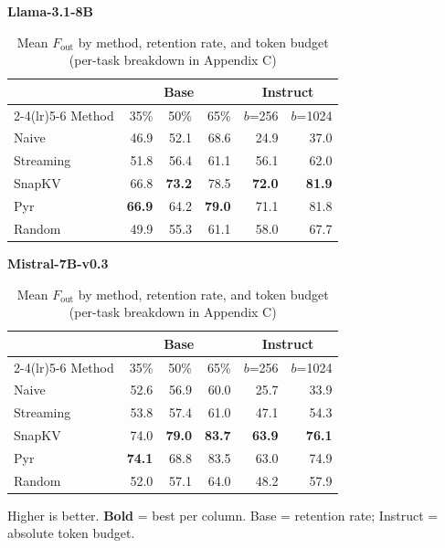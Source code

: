 \documentclass[10pt,letterpaper]{article}
\begin{document}
\begin{table}[H]
\centering
\small
\captionsetup{justification=centering}
\caption{Mean \(F_{\text{out}}\) by method, retention rate, and token budget (per-task breakdown in Appendix C)}
\label{tab:t4}
\begin{minipage}[t]{0.49\textwidth}
\centering
\textbf{Llama-3.1-8B}\\[0.4em]
\begin{tabular}{@{}lrrrrr@{}}
\toprule
& \multicolumn{3}{c}{Base} & \multicolumn{2}{c}{Instruct}\\
\cmidrule(lr){2-4}\cmidrule(lr){5-6}
Method & 35\% & 50\% & 65\% & $b$=256 & $b$=1024\\
\midrule
Naive      & 46.9 & 52.1 & 68.6 & 24.9 & 37.0\\
Streaming  & 51.8 & 56.4 & 61.1 & 56.1 & 62.0\\
SnapKV     & 66.8 & \textbf{73.2} & 78.5 & \textbf{72.0} & \textbf{81.9}\\
Pyr        & \textbf{66.9} & 64.2 & \textbf{79.0} & 71.1 & 81.8\\
Random     & 49.9 & 55.3 & 61.1 & 58.0 & 67.7\\
\bottomrule
\end{tabular}
\end{minipage}%
\hfill
\begin{minipage}[t]{0.49\textwidth}
\centering
\textbf{Mistral-7B-v0.3}\\[0.4em]
\begin{tabular}{@{}lrrrrr@{}}
\toprule
& \multicolumn{3}{c}{Base} & \multicolumn{2}{c}{Instruct}\\
\cmidrule(lr){2-4}\cmidrule(lr){5-6}
Method & 35\% & 50\% & 65\% & $b$=256 & $b$=1024\\
\midrule
Naive      & 52.6 & 56.9 & 60.0 & 25.7 & 33.9\\
Streaming  & 53.8 & 57.4 & 61.0 & 47.1 & 54.3\\
SnapKV     & 74.0 & \textbf{79.0} & \textbf{83.7} & \textbf{63.9} & \textbf{76.1}\\
Pyr        & \textbf{74.1} & 68.8 & 83.5 & 63.0 & 74.9\\
Random     & 52.0 & 57.1 & 64.0 & 48.2 & 57.9\\
\bottomrule
\end{tabular}
\end{minipage}
\par\smallskip
Higher is better. \textbf{Bold} = best per column. Base = retention rate; Instruct = absolute token budget.
\end{table}
\end{document}
